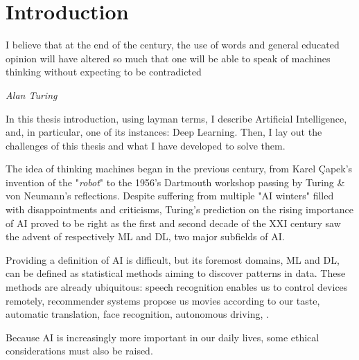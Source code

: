 \chapter{Introduction}
\label{chapter:introduction}

{}





\epigraph{I believe that at the end of the century, the use of words and general educated opinion
      will have altered so much that one will be able to speak of machines thinking without expecting to
      be contradicted}{\textit{Alan Turing}}

In this thesis introduction, using layman terms, I describe Artificial Intelligence, and,
in particular, one of its instances: Deep Learning. Then, I lay out the challenges of this
thesis and what I have developed to solve them.


The idea of thinking machines began in the previous century, from Karel Çapek's invention of the
"\textit{robot}" to the 1956's Dartmouth workshop passing by Turing \& von Neumann's reflections.
Despite suffering from multiple "AI winters" filled with disappointments and criticisms, Turing's
prediction on the rising importance of \ac{AI} proved to be right as the first and second
decade of the XXI century saw the advent of respectively \acf{ML} and \acf{DL}, two major subfields
of \ac{AI}.

Providing a definition of \ac{AI} is difficult, but its foremost domains, \ac{ML} and \ac{DL}, can be
defined as statistical methods aiming to discover patterns in data. These methods are already
ubiquitous: speech recognition enables us to control devices remotely, recommender
systems propose us movies according to our taste, automatic translation, face recognition,
autonomous driving, \etc.

Because \ac{AI} is increasingly more important in our daily lives, some ethical considerations must
also be raised. 

